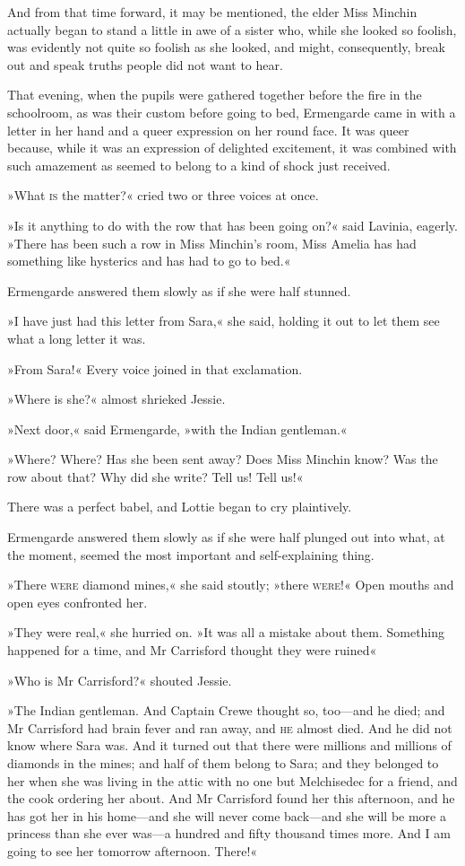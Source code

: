 And from that time forward, it may be mentioned, the elder Miss Minchin actually began to stand a little in awe of a sister who, while she looked so foolish, was evidently not quite so foolish as she looked, and might, consequently, break out and speak truths people did not want to hear.

That evening, when the pupils were gathered together before the fire in the schoolroom, as was their custom before going to bed, Ermengarde came in with a letter in her hand and a queer expression on her round face. It was queer because, while it was an expression of delighted excitement, it was combined with such amazement as seemed to belong to a kind of shock just received.

»What \textsc{is} the matter?« cried two or three voices at once.

»Is it anything to do with the row that has been going on?« said Lavinia, eagerly. »There has been such a row in Miss Minchin's room, Miss Amelia has had something like hysterics and has had to go to bed.«

Ermengarde answered them slowly as if she were half stunned.

»I have just had this letter from Sara,« she said, holding it out to let them see what a long letter it was.

»From Sara!« Every voice joined in that exclamation.

»Where is she?« almost shrieked Jessie.

»Next door,« said Ermengarde, »with the Indian gentleman.«

»Where? Where? Has she been sent away? Does Miss Minchin know? Was the row about that? Why did she write? Tell us! Tell us!«

There was a perfect babel, and Lottie began to cry plaintively.

Ermengarde answered them slowly as if she were half plunged out into what, at the moment, seemed the most important and self-explaining thing.

»There \textsc{were} diamond mines,« she said stoutly; »there \textsc{were}!« Open mouths and open eyes confronted her.

»They were real,« she hurried on. »It was all a mistake about them. Something happened for a time, and Mr Carrisford thought they were ruined\longdash«

»Who is Mr Carrisford?« shouted Jessie.

»The Indian gentleman. And Captain Crewe thought so, too—and he died; and Mr Carrisford had brain fever and ran away, and \textsc{he} almost died. And he did not know where Sara was. And it turned out that there were millions and millions of diamonds in the mines; and half of them belong to Sara; and they belonged to her when she was living in the attic with no one but Melchisedec for a friend, and the cook ordering her about. And Mr Carrisford found her this afternoon, and he has got her in his home—and she will never come back—and she will be more a princess than she ever was—a hundred and fifty thousand times more. And I am going to see her tomorrow afternoon. There!«

